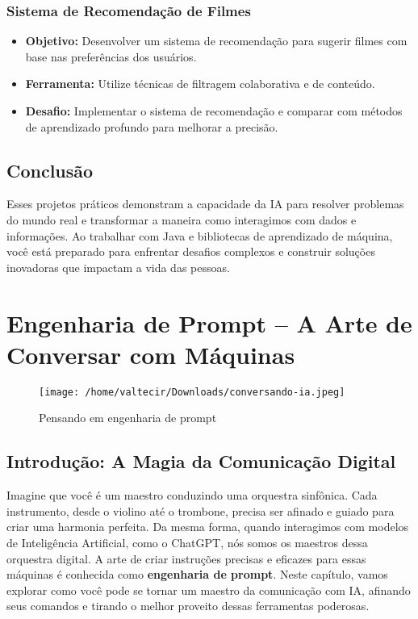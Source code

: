 \documentclass[a4paper,12pt]{book}
\begin{document}
\subsection{Sistema de Recomendação de Filmes}
\begin{itemize}
    \item \textbf{Objetivo:} Desenvolver um sistema de recomendação para sugerir filmes com base nas preferências dos usuários.
    \item \textbf{Ferramenta:} Utilize técnicas de filtragem colaborativa e de conteúdo.
    \item \textbf{Desafio:} Implementar o sistema de recomendação e comparar com métodos de aprendizado profundo para melhorar a precisão.
\end{itemize}

\section{Conclusão}
Esses projetos práticos demonstram a capacidade da IA para resolver problemas do mundo real e transformar a maneira como interagimos com dados e informações. Ao trabalhar com Java e bibliotecas de aprendizado de máquina, você está preparado para enfrentar desafios complexos e construir soluções inovadoras que impactam a vida das pessoas.

\chapter{Engenharia de Prompt – A Arte de Conversar com Máquinas}
\begin{figure}[H]
    \centering
    \texttt{[image: /home/valtecir/Downloads/conversando-ia.jpeg]}
    \caption{Pensando em engenharia de prompt}
    \label{fig:exemplo}
\end{figure}

\section{Introdução: A Magia da Comunicação Digital}

Imagine que você é um maestro conduzindo uma orquestra sinfônica. Cada instrumento, desde o violino até o trombone, precisa ser afinado e guiado para criar uma harmonia perfeita. Da mesma forma, quando interagimos com modelos de Inteligência Artificial, como o ChatGPT, nós somos os maestros dessa orquestra digital. A arte de criar instruções precisas e eficazes para essas máquinas é conhecida como \textbf{engenharia de prompt}. Neste capítulo, vamos explorar como você pode se tornar um maestro da comunicação com IA, afinando seus comandos e tirando o melhor proveito dessas ferramentas poderosas.
\end{document}
